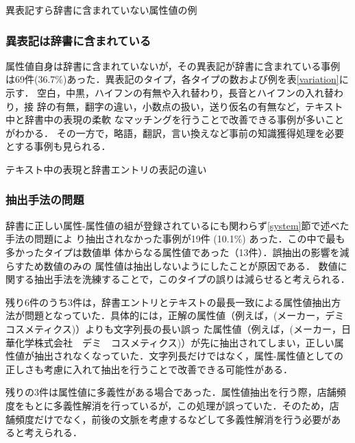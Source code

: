 \documentclass[japanese]{jnlp_1.4}
\begin{document}
\begin{table}[b]
\caption{異表記すら辞書に含まれていない属性値の例}
\label{fn_type}

\end{table}


\subsubsection{異表記は辞書に含まれている}
\label{containedSpellingVariation}

属性値自身は辞書に含まれていないが，その異表記が辞書に含まれている事例
は69件(36.7\%)あった．異表記のタイプ，各タイプの数および例を表\ref{variation}に
示す．
空白，中黒，ハイフンの有無や入れ替わり，長音とハイフンの入れ替わり，接
辞の有無，翻字の違い，小数点の扱い，送り仮名の有無など，テキスト中と辞書中の表現の柔軟
なマッチングを行うことで改善できる事例が多いことがわかる．
その一方で，略語，翻訳，言い換えなど事前の知識獲得処理を必要とする事例も見られる．

\begin{table}[b]
\caption{テキスト中の表現と辞書エントリの表記の違い}
\label{variation}

\end{table}



\subsubsection{抽出手法の問題}

辞書に正しい属性-属性値の組が登録されているにも関わらず\ref{system}節で述べた手法の問題によ
り抽出されなかった事例が19件 (10.1\%) あった．この中で最も多かったタイプは数値単
体からなる属性値であった（13件）．誤抽出の影響を減らすため数値のみの
属性値は抽出しないようにしたことが原因である．
数値に関する抽出手法を洗練することで，このタイプの誤りは減らせると考えられる．

残り6件のうち3件は，辞書エントリとテキストの最長一致による属性値抽出方
法が問題となっていた．具体的には，正解の属性値（例えば，(メーカー，デミ　コスメティクス)）よりも文字列長の長い誤っ
た属性値（例えば，(メーカー，日華化学株式会社　デミ　コスメティクス)）が先に抽出されてしまい，正しい属性値が抽出されなくなっていた．文字列長だけではなく，属性-属性値としての正しさも考慮に入れて抽出を行うことで改善できる可能性がある．

残りの3件は属性値に多義性がある場合であった．属性値抽出を行う際，店舗頻
度をもとに多義性解消を行っているが，この処理が誤っていた．そのため，店
舗頻度だけでなく，前後の文脈を考慮するなどして多義性解消を行う必要があ
ると考えられる．
\end{document}
